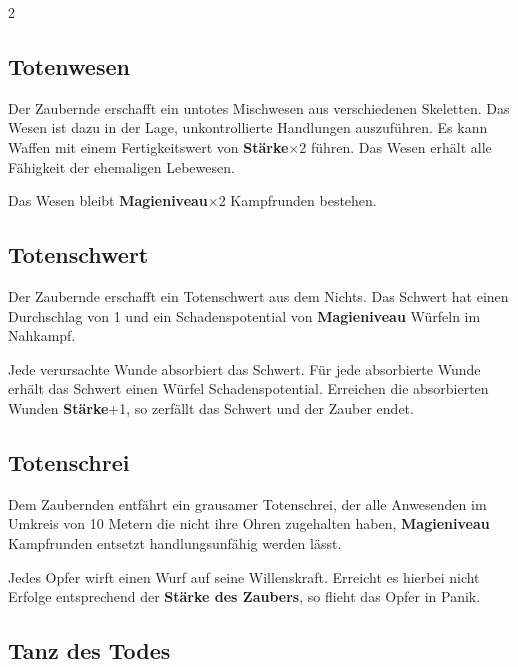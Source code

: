\begin{multicols*}{2}
\subsection{Totenwesen}

Der Zaubernde erschafft ein untotes Mischwesen aus verschiedenen Skeletten. Das Wesen ist dazu in der Lage, unkontrollierte Handlungen auszuführen. Es kann Waffen mit einem Fertigkeitswert von \textbf{Stärke}×2 führen. Das Wesen erhält alle Fähigkeit der ehemaligen Lebewesen.

Das Wesen bleibt \textbf{Magieniveau}×2 Kampfrunden bestehen.



\subsection{Totenschwert}

Der Zaubernde erschafft ein Totenschwert aus dem Nichts. Das Schwert hat einen Durchschlag von 1 und ein Schadenspotential von \textbf{Magieniveau} Würfeln im Nahkampf.

Jede verursachte Wunde absorbiert das Schwert. Für jede absorbierte Wunde erhält das Schwert einen Würfel Schadenspotential. Erreichen die absorbierten Wunden \textbf{Stärke}+1, so zerfällt das Schwert und der Zauber endet.



\subsection{Totenschrei}

Dem Zaubernden entfährt ein grausamer Totenschrei, der alle Anwesenden im Umkreis von 10 Metern die nicht ihre Ohren zugehalten haben, \textbf{Magieniveau} Kampfrunden entsetzt handlungsunfähig werden lässt.

Jedes Opfer wirft einen Wurf auf seine Willenskraft. Erreicht es hierbei nicht Erfolge entsprechend der \textbf{Stärke des Zaubers}, so flieht das Opfer in Panik.



\subsection{Tanz des Todes}


\end{multicols*}
